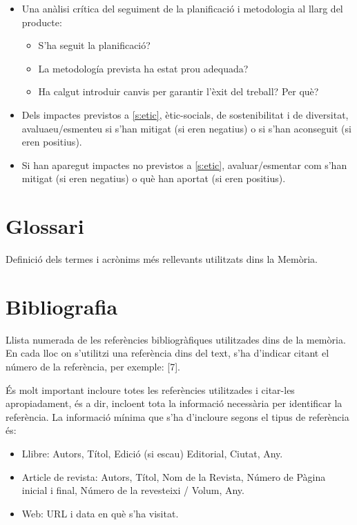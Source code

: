 \documentclass[CAT,BIB]{TFUOC}%
\begin{document}
\begin{itemize}
\item 
Una anàlisi crítica del seguiment de la planificació i metodologia al llarg del producte:
\begin{itemize}
    \item S’ha seguit la planificació?
    \item La metodología prevista ha estat prou adequada?
    \item Ha calgut introduir canvis per garantir l’èxit del treball? Per què?
\end{itemize}
\item Dels impactes previstos a \ref{s:etic}, ètic-socials, de sostenibilitat i de diversitat, avaluaeu/esmenteu si s'han mitigat (si eren negatius) o si s'han aconseguit (si eren positius). 
\item Si han aparegut impactes no previstos a \ref{s:etic}, avaluar/esmentar com s'han mitigat (si eren negatius) o què han aportat (si eren positius).
\end{itemize}

\chapter{Glossari}

Definició dels termes i acrònims més rellevants utilitzats dins la Memòria.


\chapter{Bibliografia}

Llista numerada de les referències bibliogràfiques utilitzades dins de la memòria. En cada lloc on s'utilitzi una referència dins del text, s'ha d'indicar citant el número de la referència, per exemple: [7].

És molt important incloure totes les referències utilitzades i citar-les apropiadament, és a dir, incloent tota la informació necessària per identificar la referència. La informació mínima que s'ha d'incloure segons el tipus de referència és:

\begin{itemize}
\item Llibre: Autors, Títol, Edició (si escau) Editorial, Ciutat, Any.
\item  Article de revista: Autors, Títol, Nom de la Revista, Número de Pàgina inicial i final, Número de la revesteixi / Volum, Any.
\item  Web: URL i data en què s'ha visitat.
\end{itemize}
\end{document}
